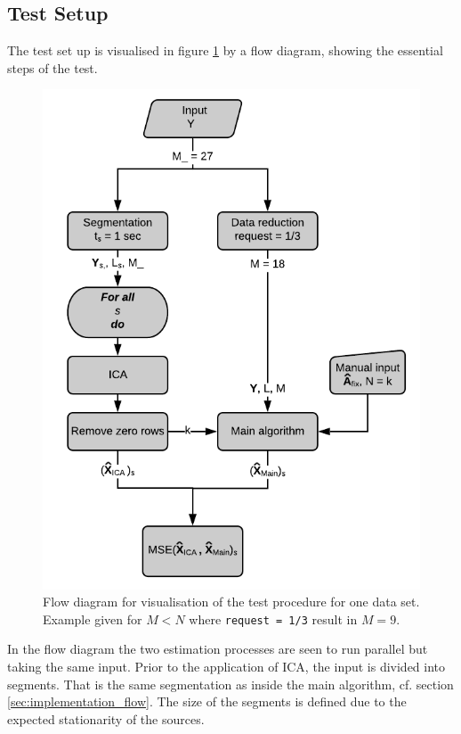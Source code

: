 \subsection{Test Setup}
The test set up is visualised in figure \ref{fig:flow2} by a flow diagram, showing the essential steps of the test. 
\begin{figure}[H]
    \centering
	\includegraphics[scale=1]{figures/ch_7/flow2.png}
	\caption{Flow diagram for visualisation of the test procedure for one data set. Example given for $M<N$ where \texttt{request = 1/3} result in $M=9$.}
	\label{fig:flow2}
\end{figure}
In the flow diagram the two estimation processes are seen to run parallel but taking the same input. 
Prior to the application of ICA, the input is divided into segments. 
That is the same segmentation as inside the main algorithm, cf. section \ref{sec:implementation_flow}.
The size of the segments is defined due to the expected stationarity of the sources. 
